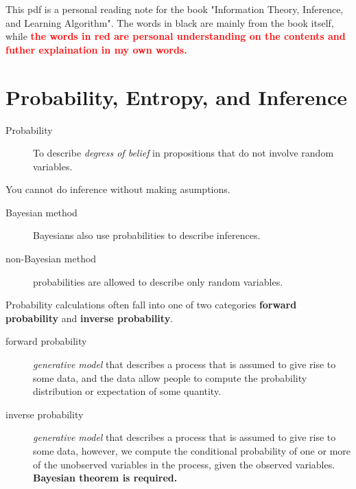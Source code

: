\documentclass[11pt]{article}
\begin{document}
This pdf is a personal reading note for the book "Information Theory, Inference, and Learning Algorithm". The words in black are mainly from the book itself, while \textbf{\textcolor{red}{the words in red are personal understanding on the contents and futher explaination in my own words.} }

\newpage


\tableofcontents

\newpage


\thispagestyle{fancy} 
\clearpage






\section{Probability, Entropy, and Inference}

\begin{description}
  \item[Probability] To describe \textit{degress of belief} in propositions that do not involve random variables.
\end{description}

You cannot do inference without making asumptions.

\begin{description}
  \item[Bayesian method] Bayesians also use probabilities to describe inferences.

  \item[non-Bayesian method] probabilities are allowed to describe only random variables.
\end{description}

Probability calculations often fall into one of two categories \textbf{forward probability} and \textbf{inverse probability}.

\begin{description}
  \item[forward probability] \textit{generative model} that describes a process that is assumed to give rise to some data, and the data allow people to compute the probability distribution or expectation of some quantity.

  \item[inverse probability] \textit{generative model} that describes a process that is assumed to give rise to some data, however, we compute the conditional probability of one or more of the unobserved variables in the process, given the observed variables. \textbf{Bayesian theorem is required.}
\end{description}
\end{document}
